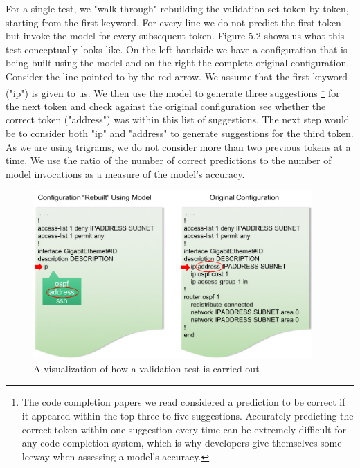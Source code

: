 \documentclass[../thesis.tex]{subfiles}
\begin{document}
For a single test, we "walk through" rebuilding the validation set token-by-token, starting from the first keyword. For every line we do not predict the first token but invoke the model for every subsequent token. Figure 5.2 shows us what this test conceptually looks like. On the left handside we have a configuration that is being built using the model and on the right the complete original configuration. Consider the line pointed to by the red arrow. We assume that the first keyword ("ip") is given to us. We then use the model to generate three suggestions
\footnote{The code completion papers we read considered a prediction to be correct if it appeared within the top three to five suggestions. Accurately predicting the correct token within one suggestion every time can be extremely difficult for any code completion system, which is why developers give themselves some leeway when assessing a model's accuracy.}
for the next token and check against the original configuration see whether the correct token ("address") was within this list of suggestions. The next step would be to consider both "ip" and "address" to generate suggestions for the third token. As we are using trigrams, we do not consider more than two previous tokens at a time. We use the ratio of the number of correct predictions to the number of model invocations as a measure of the model's accuracy.\\

\begin{figure}[H]
	\centering
	\includegraphics[width=4.2in]{validation_example.png}
	\caption{A visualization of how a validation test is carried out}
\end{figure}
\end{document}
